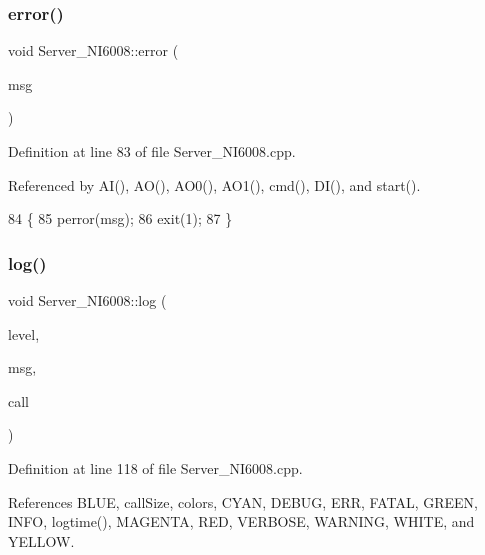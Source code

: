 \mbox{\label{classServer__NI6008_a7bcfa6ba683c63b68c624644ccfb8597}} 
\subsubsection{\texorpdfstring{error()}{error()}}
{\footnotesize\ttfamily void Server\+\_\+\+N\+I6008\+::error (\begin{DoxyParamCaption}\item[{const char $\ast$}]{msg }\end{DoxyParamCaption})}



Definition at line 83 of file Server\+\_\+\+N\+I6008.\+cpp.



Referenced by A\+I(), A\+O(), A\+O0(), A\+O1(), cmd(), D\+I(), and start().


\begin{DoxyCode}
84 \{
85     perror(msg);
86     exit(1);
87 \}
\end{DoxyCode}
\mbox{\label{classServer__NI6008_ab83d0f144d5bb34f3a22aabef37de440}} 
\subsubsection{\texorpdfstring{log()}{log()}}
{\footnotesize\ttfamily void Server\+\_\+\+N\+I6008\+::log (\begin{DoxyParamCaption}\item[{\hyperlink{classServer__NI6008_af1e3e3bac26355a746b5d2e548fe25be}{Msg\+Level}}]{level,  }\item[{std\+::string}]{msg,  }\item[{std\+::string}]{call }\end{DoxyParamCaption})}



Definition at line 118 of file Server\+\_\+\+N\+I6008.\+cpp.



References B\+L\+UE, call\+Size, colors, C\+Y\+AN, D\+E\+B\+UG, E\+RR, F\+A\+T\+AL, G\+R\+E\+EN, I\+N\+FO, logtime(), M\+A\+G\+E\+N\+TA, R\+ED, V\+E\+R\+B\+O\+SE, W\+A\+R\+N\+I\+NG, W\+H\+I\+TE, and Y\+E\+L\+L\+OW.



